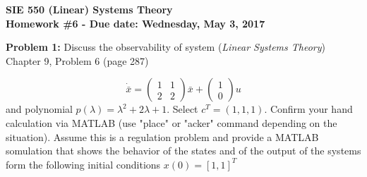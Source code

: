 \documentclass[12pt]{article}
\begin{document}
{\centering
 \textbf{SIE 550 (Linear) Systems Theory\\Homework \#6 - Due date: Wednesday, May 3, 2017 \newline}\par
 
} 

\noindent
\textbf{Problem 1:} Discuss the observability of system ({\em Linear Systems Theory}) Chapter 9, Problem 6 (page 287)
	
$$
\dot{\bar{x}}=
\begin{pmatrix}
	1 & 1 \\
	2 & 2
\end{pmatrix}
\bar{x}+
\begin{pmatrix}
	1 \\
	0
\end{pmatrix} u
$$
and polynomial $p(\lambda)=\lambda^2+2\lambda+1$. Select $c^T=(1, 1, 1)$.
Confirm your hand calculation via MATLAB (use "place" or "acker" command depending on the situation). Assume this is a regulation problem and provide a MATLAB somulation that shows the behavior of the states and of the output of the systems form the following initial conditions $x(0)=[1,1]^T$
\end{document}
